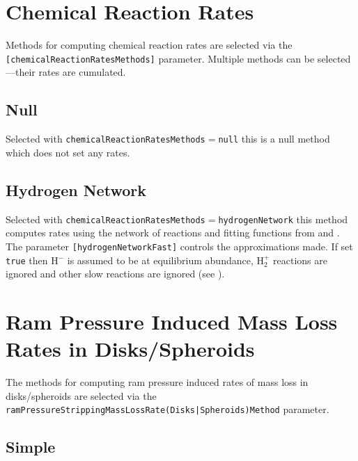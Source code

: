 \section{Chemical Reaction Rates}\label{sec:ChemicalReactionRates}

Methods for computing chemical reaction rates are selected via the {\tt [chemicalReactionRatesMethods]} parameter. Multiple methods can be selected---their rates are cumulated.

\subsection{Null}

Selected with {\tt chemicalReactionRatesMethods}$=${\tt null} this is a null method which does not set any rates.

\subsection{Hydrogen Network}

Selected with {\tt chemicalReactionRatesMethods}$=${\tt hydrogenNetwork} this method computes rates using the network of reactions and fitting functions from \cite{abel_modeling_1997} and \cite{tegmark_small_1997}. The parameter {\tt [hydrogenNetworkFast]} controls the approximations made. If set {\tt true} then H$^-$ is assumed to be at equilibrium abundance, H$_2^+$ reactions are ignored and other slow reactions are ignored (see \citealt{abel_modeling_1997}).

\section{Ram Pressure Induced Mass Loss Rates in Disks/Spheroids}\label{sec:RamPressureMassLossRates}

The methods for computing ram pressure induced rates of mass loss in disks/spheroids are selected via the {\tt ramPressureStrippingMassLossRate(Disks|Spheroids)Method} parameter.

\subsection{Simple}

